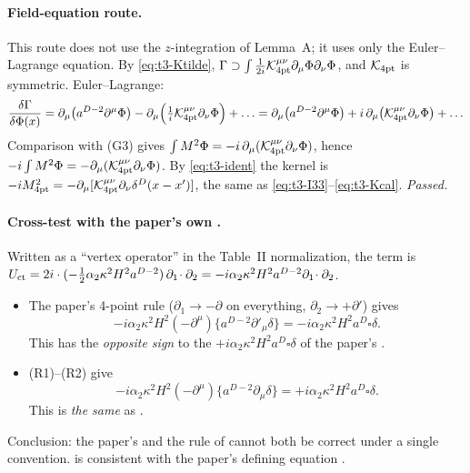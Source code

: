 \paragraph{Field-equation route.}
This route does not use the \(z\)-integration of Lemma~A; it uses only the
Euler--Lagrange equation. By \eqref{eq:t3-Ktilde},
\(\Gamma\supset\int\frac1{2i}\mathcal K^{\mu\nu}_{\rm 4pt}\partial_\mu\Phi\partial_\nu\Phi\), and
\(\mathcal K_{\rm 4pt}\) is symmetric. Euler--Lagrange:
\begin{equation}\label{eq:t3-EL}
\frac{\delta\Gamma}{\delta\Phi(x)}=\partial_\mu\bigl(a^{D-2}\partial^\mu\Phi\bigr)-\partial_\mu\Bigl(\tfrac1i\mathcal K^{\mu\nu}_{\rm 4pt}\partial_\nu\Phi\Bigr)+\ldots
=\partial_\mu\bigl(a^{D-2}\partial^\mu\Phi\bigr)+i\,\partial_\mu\bigl(\mathcal K^{\mu\nu}_{\rm 4pt}\partial_\nu\Phi\bigr)+\ldots
\end{equation}
Comparison with (G3) gives \(\int M^2\Phi=-i\,\partial_\mu(\mathcal K^{\mu\nu}_{\rm 4pt}\partial_\nu\Phi)\),
hence \(-i\int M^2\Phi=-\partial_\mu(\mathcal K^{\mu\nu}_{\rm 4pt}\partial_\nu\Phi)\). By
\eqref{eq:t3-ident} the kernel is \(-iM^2_{\rm 4pt}=-\partial_\mu[\mathcal K^{\mu\nu}_{\rm 4pt}\partial_\nu\delta^D(x-x')]\),
the same as \eqref{eq:t3-I33}--\eqref{eq:t3-Kcal}. \emph{Passed.}

\paragraph{Cross-test with the paper's own .}
Written as a ``vertex operator'' in the Table~II normalization, the term  is
\(U_{\rm ct}=2i\cdot(-\tfrac12\alpha_2\kappa^2H^2a^{D-2})\,\partial_1\!\cdot\partial_2=-i\alpha_2\kappa^2H^2a^{D-2}\partial_1\!\cdot\partial_2\).
\begin{itemize}
\item The paper's 4-point rule (\(\partial_1\to-\partial\) on everything, \(\partial_2\to+\partial'\)) gives
\begin{equation*}
-i\alpha_2\kappa^2H^2(-\partial^\mu)\{a^{D-2}\partial'_\mu\delta\}=-i\alpha_2\kappa^2H^2a^D\square\delta .
\end{equation*}
This has the \emph{opposite sign} to the \(+i\alpha_2\kappa^2H^2a^D\square\delta\) of the
paper's .
\item (R1)--(R2) give
\begin{equation*}
-i\alpha_2\kappa^2H^2(-\partial^\mu)\{a^{D-2}\partial_\mu\delta\}=+i\alpha_2\kappa^2H^2a^D\square\delta .
\end{equation*}
This is \emph{the same} as .
\end{itemize}
Conclusion: the paper's  and the rule of  cannot both be correct under a
single convention.  is consistent with the paper's defining equation .


